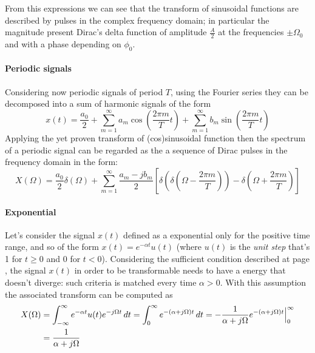 	From this expressions we can see that the transform of sinusoidal functions are described by pulses in the complex frequency domain; in particular the magnitude present Dirac's delta function of amplitude $\frac A 2$ at the frequencies $\pm \Omega_0$ and with a phase depending on $\phi_0$.
	
	\paragraph{Periodic signals} Considering now periodic signals of period $T$, using the Fourier series they can be decomposed into a sum of harmonic signals of the form
	\[ x(t) = \frac{a_0}{2} + \sum_{m=1}^\infty a_m \cos\left( \frac{2\pi m}{T} t \right) + \sum_{m=1}^\infty b_m \sin\left( \frac{2\pi m}{T} t \right) \]
	Applying the yet proven transform of (cos)sinusoidal function then the spectrum of a periodic signal can be regarded as the a sequence of Dirac pulses in the frequency domain in the form:
	\begin{equation}
		X(\Omega) = \frac{a_0}{2} \delta(\Omega) + \sum_{m=1}^{\infty} \frac{a_m - j b_m}{2} \left[ \delta\left( \delta \left( \Omega - \frac{2\pi m}{T}\right) \right) - \delta\left( \Omega + \frac{2\pi m}{T} \right) \right]
	\end{equation}

	\paragraph{Exponential} Let's consider the signal $x(t)$ defined as a exponential only for the positive time range, and so of the form $x(t) = e^{-\alpha t} u(t)$ (where $u(t)$ is the \textit{unit step} that's 1 for $t\geq 0$ and 0 for $t<0$). Considering the sufficient condition described at page \pageref{sec:four:sufficient}, the signal $x(t)$ in order to be transformable needs to have a energy that doesn't diverge: such criteria is matched every time $\alpha >0$. With this assumption the associated transform can be computed as
	\begin{equation}
	\begin{aligned}
		X(\Omega) & = \int_{-\infty}^\infty e^{-\alpha t} u(t) e^{-j\Omega t}\, dt = \int_0 ^\infty e^{-(\alpha + j\Omega) t} \, dt = - \frac{1}{\alpha + j\Omega} e^{-(\alpha + j\Omega) t} \Big|_0^\infty \\
		& = \frac{1}{\alpha + j\Omega}
	\end{aligned}
	\end{equation}
	

